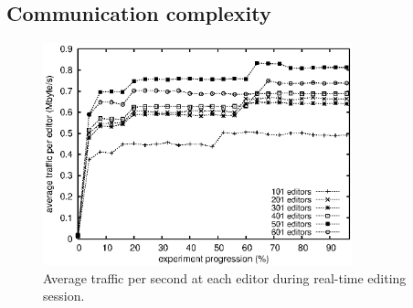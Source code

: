 
\subsection{Communication complexity}

\begin{figure}
  \centering
  \includegraphics[width=0.8\textwidth]{./img/communication.eps}
  \caption{\label{fig:traffic} Average traffic per second at each editor during
    real-time editing session.}
\end{figure}

